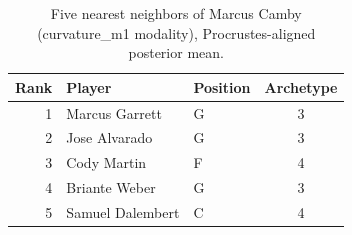 \begin{table}[htbp]
  \centering\small
  \begin{tabular}{rllc}
    \toprule
    Rank & Player & Position & Archetype \\
    \midrule
    1 & Marcus Garrett & G & 3 \\
    2 & Jose Alvarado & G & 3 \\
    3 & Cody Martin & F & 4 \\
    4 & Briante Weber & G & 3 \\
    5 & Samuel Dalembert & C & 4 \\
    \bottomrule
  \end{tabular}
  \caption{Five nearest neighbors of Marcus Camby (curvature_m1 modality), Procrustes-aligned posterior mean.}
  \label{tab:Marcus_Camby_neighbors_curvature_m1}
\end{table}

